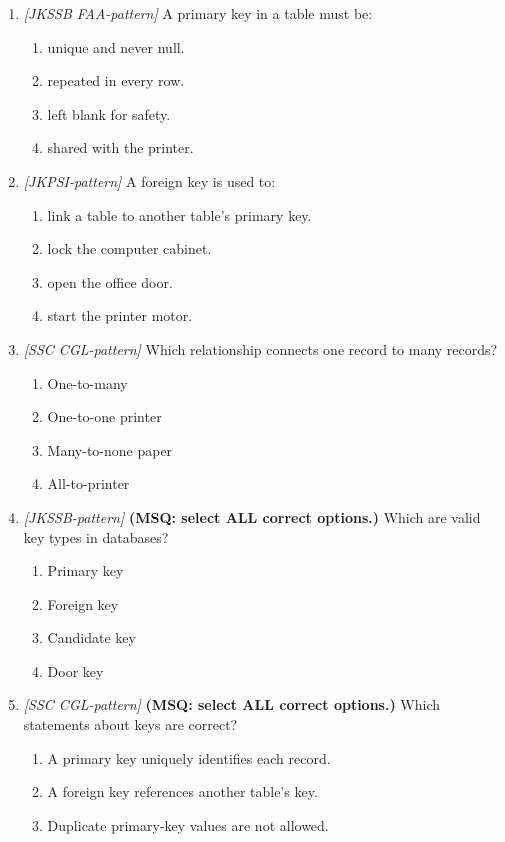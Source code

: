 \begin{enumerate}[label=\textbf{Q\arabic*.}, leftmargin=*]
\item \textit{[JKSSB FAA-pattern]} A primary key in a table must be:
  \begin{enumerate}[label=\Alph*.]
    \item unique and never null.
    \item repeated in every row.
    \item left blank for safety.
    \item shared with the printer.
  \end{enumerate}
\item \textit{[JKPSI-pattern]} A foreign key is used to:
  \begin{enumerate}[label=\Alph*.]
    \item link a table to another table's primary key.
    \item lock the computer cabinet.
    \item open the office door.
    \item start the printer motor.
  \end{enumerate}
\item \textit{[SSC CGL-pattern]} Which relationship connects one record to many records?
  \begin{enumerate}[label=\Alph*.]
    \item One-to-many
    \item One-to-one printer
    \item Many-to-none paper
    \item All-to-printer
  \end{enumerate}
\item \textit{[JKSSB-pattern]} \textbf{(MSQ: select ALL correct options.)} Which are valid key types in databases?
  \begin{enumerate}[label=\Alph*.]
    \item Primary key
    \item Foreign key
    \item Candidate key
    \item Door key
  \end{enumerate}
\item \textit{[SSC CGL-pattern]} \textbf{(MSQ: select ALL correct options.)} Which statements about keys are correct?
  \begin{enumerate}[label=\Alph*.]
    \item A primary key uniquely identifies each record.
    \item A foreign key references another table's key.
    \item Duplicate primary-key values are not allowed.

\end{enumerate}
\end{enumerate}
